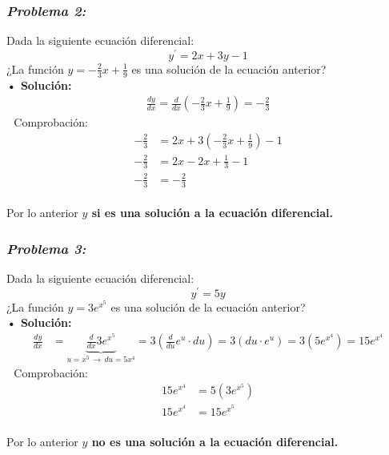\documentclass[letterpaper, 12pt]{article}
\begin{document}
\subsubsection*{\emph{Problema 2:}}
Dada la siguiente ecuación diferencial:
\[y^\prime=2x+3y-1\]
¿La función \(y=-\frac{2}{3}x+\frac{1}{9}\) es una solución de la ecuación anterior?
\\\newline
\textbf{• Solución:}
\begin{equation*}
    \begin{aligned}
        \frac{dy}{dx}=\frac{d}{dx}\left(-\frac{2}{3}x+\frac{1}{9}\right)=-\frac{2}{3}
    \end{aligned}
\end{equation*}
\,\, Comprobación:
\begin{equation*}
    \begin{aligned}
        -\frac{2}{3}&=2x+3\left(-\frac{2}{3}x+\frac{1}{9}\right)-1\\
        -\frac{2}{3}&=2x-2x+\frac{1}{3}-1\\
        -\frac{2}{3}&=-\frac{2}{3}
    \end{aligned}
\end{equation*}
\\
Por lo anterior \textbf{\(y\) si es una solución a la ecuación diferencial.}
\subsubsection*{\emph{Problema 3:}}
Dada la siguiente ecuación diferencial:
\[y^\prime=5y\]
¿La función \(y=3e^{x^5}\) es una solución de la ecuación anterior?
\\\newline
\textbf{• Solución:}
\begin{equation*}
    \begin{aligned}
        \frac{dy}{dx}&=\underbrace{\frac{d}{dx}3e^{x^5}}_{u=x^5\,\rightarrow\, du=5x^4}
        =3\left(\frac{d}{du}e^u\cdot du\right)=3\left(du\cdot e^u\right)=3\left(5e^{x^4}\right)=15e^{x^4}
    \end{aligned}
\end{equation*}
\,\, Comprobación:
\begin{equation*}
    \begin{aligned}
        15e^{x^4}&=5\left(3e^{x^5}\right)\\
        15e^{x^4}&=15e^{x^5}
    \end{aligned}
\end{equation*}
\\
Por lo anterior \textbf{\(y\) no es una solución a la ecuación diferencial.}
\end{document}
